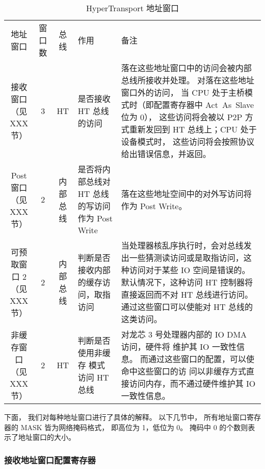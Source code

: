 \begin{table}[htbp]
  \centering
  \begin{tabular}{|c|c|c|p{2.5cm}|p{6.5cm}|} \hline
    地址窗口 & 窗口数 & 总线 & 作用 & 备注 \\ \hhline
    \ptabincell{c}{接收窗口 \\ （见 XXX 节）}      & 3 & HT       &
    是否接收 HT 总线的访问 &
    落在这些地址窗口中的访问会被内部总线所接收并处理。
    对落在这些地址窗口外的访问， 当 CPU 处于主桥模式时（即配置寄存器中
    Act~As~Slave 位为 0）， 这些访问将会被以 P2P 方式重新发回到 HT 总线上；CPU
    处于设备模式时， 这些访问将会按照协议给出错误信息，并返回。 \\ \hline

    \ptabincell{c}{Post 窗口 \\（见 XXX 节）}      & 2 & 内部总线 &
    是否将内部总线对 HT 总线的写访问作为 Post Write &
    落在这些地址空间中的对外写访问将作为 Post Write。\\ \hline

    \ptabincell{c}{可预取窗口 2 \\ （见 XXX 节）}  & 2 & 内部总线 &
    判断是否接收内部的缓存访问，取指访问 &
    当处理器核乱序执行时，会对总线发出一些猜测读访问或是取指访问，这种访问对于某些
    IO 空间是错误的。 默认情况下，这种访问 HT 控制器将直接返回而不对 HT
    总线进行访问。通过这些窗口可以使能对 HT 总线的这类访问。 \\ \hline

    \ptabincell{c}{非缓存窗口 \\ （见 XXX 节）} & 2 & HT       & 判断是否使用非缓存
    模式访问 HT 总线 & 对龙芯 3 号处理器内部的 IO DMA 访问，硬件将
    维护其 IO 一致性信息。 而通过这些窗口的配置，可以使命中这些窗口的访
    问以非缓存方式直接访问内存，而不通过硬件维护其 IO 一致性信息。
    \\ \hline
  \end{tabular}
  \caption{HyperTransport 地址窗口}
  \label{tab:htwindows}
\end{table}

下面， 我们对每种地址窗口进行了具体的解释。 以下几节中， 所有地址窗口寄存器的
MASK 皆为网络掩码格式， 即高位为 1，低位为 0。 掩码中 0
的个数则表示了地址窗口的大小。

\subsubsection{接收地址窗口配置寄存器}

